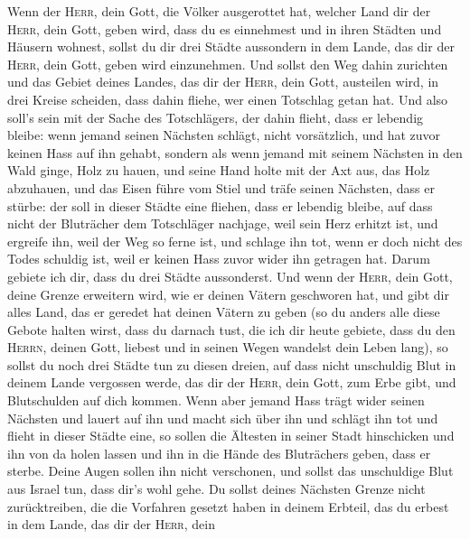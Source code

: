  Wenn der \textsc{Herr}, dein Gott, die Völker ausgerottet
hat, welcher Land dir der \textsc{Herr}, dein Gott, geben wird, dass du
es einnehmest und in ihren Städten und Häusern wohnest, 
sollst du dir drei Städte aussondern in dem Lande, das dir der
\textsc{Herr}, dein Gott, geben wird einzunehmen.  Und
sollst den Weg dahin zurichten und das Gebiet deines Landes, das dir der
\textsc{Herr}, dein Gott, austeilen wird, in drei Kreise scheiden, dass
dahin fliehe, wer einen Totschlag getan hat.  Und also
soll's sein mit der Sache des Totschlägers, der dahin flieht, dass er
lebendig bleibe: wenn jemand seinen Nächsten schlägt, nicht vorsätzlich,
und hat zuvor keinen Hass auf ihn gehabt,  sondern als
wenn jemand mit seinem Nächsten in den Wald ginge, Holz zu hauen, und
seine Hand holte mit der Axt aus, das Holz abzuhauen, und das Eisen
führe vom Stiel und träfe seinen Nächsten, dass er stürbe: der soll in
dieser Städte eine fliehen, dass er lebendig bleibe,  auf
dass nicht der Bluträcher dem Totschläger nachjage, weil sein Herz
erhitzt ist, und ergreife ihn, weil der Weg so ferne ist, und schlage
ihn tot, wenn er doch nicht des Todes schuldig ist, weil er keinen Hass
zuvor wider ihn getragen hat.  Darum gebiete ich dir, dass
du drei Städte aussonderst.  Und wenn der \textsc{Herr},
dein Gott, deine Grenze erweitern wird, wie er deinen Vätern geschworen
hat, und gibt dir alles Land, das er geredet hat deinen Vätern zu geben
 (so du anders alle diese Gebote halten wirst, dass du
darnach tust, die ich dir heute gebiete, dass du den \textsc{Herrn},
deinen Gott, liebest und in seinen Wegen wandelst dein Leben lang), so
sollst du noch drei Städte tun zu diesen dreien,  auf
dass nicht unschuldig Blut in deinem Lande vergossen werde, das dir der
\textsc{Herr}, dein Gott, zum Erbe gibt, und Blutschulden auf dich
kommen.  Wenn aber jemand Hass trägt wider seinen
Nächsten und lauert auf ihn und macht sich über ihn und schlägt ihn tot
und flieht in dieser Städte eine,  so sollen die Ältesten
in seiner Stadt hinschicken und ihn von da holen lassen und ihn in die
Hände des Bluträchers geben, dass er sterbe.  Deine Augen
sollen ihn nicht verschonen, und sollst das unschuldige Blut aus Israel
tun, dass dir's wohl gehe.  Du sollst deines Nächsten
Grenze nicht zurücktreiben, die die Vorfahren gesetzt haben in deinem
Erbteil, das du erbest in dem Lande, das dir der \textsc{Herr}, dein
